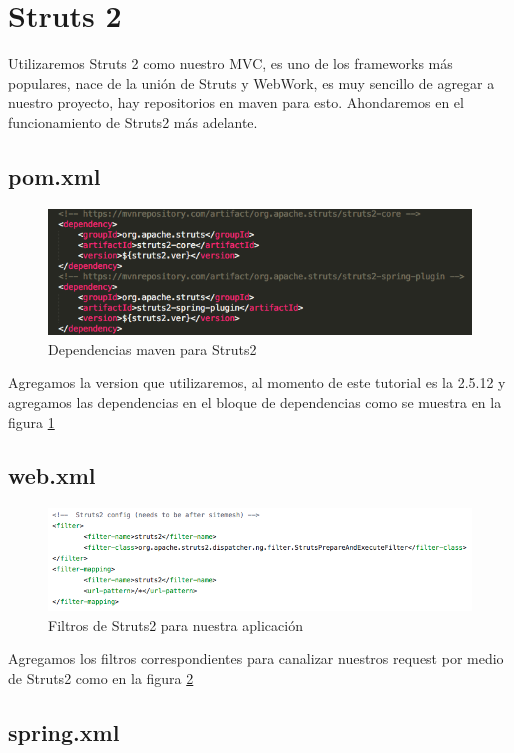 \documentclass[12pt,a4paper]{article}
\begin{document}
    \section{Struts 2}
		Utilizaremos Struts 2 como nuestro MVC, es uno de los frameworks m\'as populares, nace de la uni\'on de Struts y WebWork, es muy sencillo de agregar a nuestro proyecto, hay repositorios en maven para esto. Ahondaremos en el funcionamiento de Struts2 m\'as adelante.
		\subsection{pom.xml}
        \begin{figure}[h]
            \centering
            \includegraphics[scale=0.4]{11_pom_xml}
            \caption{Dependencias maven para Struts2}
            \label{11_pom_xml}
        \end{figure}
		Agregamos la version que utilizaremos, al momento de este tutorial es la 2.5.12 y agregamos las dependencias en el bloque de dependencias como se muestra en la figura \ref{11_pom_xml}
		\subsection{web.xml}
        \begin{figure}[h]
            \centering
            \includegraphics[scale=0.4]{12_web_xml}
            \caption{Filtros de Struts2 para nuestra aplicaci\'on}
            \label{12_web_xml}
        \end{figure}
		Agregamos los filtros correspondientes para canalizar nuestros request por medio de Struts2 como en la figura \ref{12_web_xml}
		\newpage
		\subsection{spring.xml}
		\newpage
\end{document}
